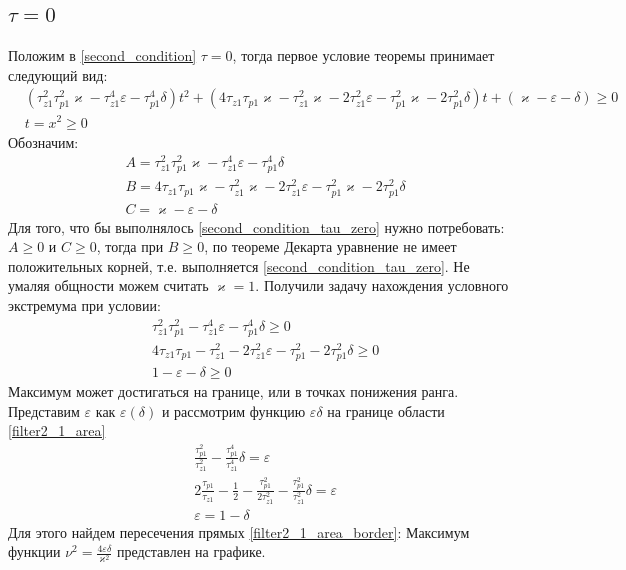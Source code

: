 \documentclass[a4paper,14pt]{extarticle} %
\begin{document}
\subsection{$\tau = 0$}
Положим в \eqref{second_condition} $\tau = 0$, тогда первое условие теоремы принимает следующий вид:
 \begin{equation}\label{second_condition_tau_zero}
 \begin{aligned}
&(\tau_{z1}^2\tau_{p1}^2\varkappa - \tau_{z1}^4\varepsilon - \tau_{p1}^4\delta)t^2 +( 4\tau_{z1}\tau_{p1}\varkappa - \tau_{z1}^2\varkappa - 2\tau_{z1}^2\varepsilon - \tau_{p1}^2\varkappa - 2\tau_{p1}^2\delta)t + (\varkappa-\varepsilon - \delta)  \geq 0\\
&t = x^2 \geq 0
 \end{aligned}
\end{equation}
Обозначим:
 \begin{equation}
 \begin{aligned}
&A = \tau_{z1}^2\tau_{p1}^2\varkappa - \tau_{z1}^4\varepsilon - \tau_{p1}^4\delta\\
&B = 4\tau_{z1}\tau_{p1}\varkappa - \tau_{z1}^2\varkappa - 2\tau_{z1}^2\varepsilon - \tau_{p1}^2\varkappa - 2\tau_{p1}^2\delta\\
&C = \varkappa-\varepsilon - \delta
 \end{aligned}
\end{equation}
Для того, что бы выполнялось \eqref{second_condition_tau_zero} нужно потребовать: $A \geq 0$ и $C \geq 0$, тогда  при $B \geq 0$, по теореме Декарта уравнение не имеет положительных корней, т.е. выполняется \eqref{second_condition_tau_zero}. Не умаляя общности можем считать $\varkappa = 1$. Получили задачу нахождения условного экстремума при условии:
 \begin{equation}\label{filter2_1_area}
 \begin{aligned}
&\tau_{z1}^2\tau_{p1}^2 - \tau_{z1}^4\varepsilon - \tau_{p1}^4\delta \geq 0\\
&4\tau_{z1}\tau_{p1} - \tau_{z1}^2 - 2\tau_{z1}^2\varepsilon - \tau_{p1}^2 - 2\tau_{p1}^2\delta \geq 0\\
&1-\varepsilon - \delta \geq 0
 \end{aligned}
\end{equation}
Максимум может достигаться на границе, или в точках понижения ранга. Представим $\varepsilon$ как $\varepsilon(\delta)$ и рассмотрим функцию $\varepsilon\delta$ на границе области \eqref{filter2_1_area}
 \begin{equation}\label{filter2_1_area_border}
 \begin{aligned}
&\frac{\tau_{p1}^2}{\tau_{z1}^2} - \frac{\tau_{p1}^4}{\tau_{z1}^4}\delta =\varepsilon\\
&2\frac{\tau_{p1}}{\tau_{z1}} - \frac{1}{2} - \frac{\tau_{p1}^2}{2\tau_{z1}^2} - \frac{\tau_{p1}^2}{\tau_{z1}^2}\delta =  \varepsilon\\
&\varepsilon = 1 - \delta
 \end{aligned}
\end{equation}
 Для этого найдем пересечения прямых \eqref{filter2_1_area_border}:
  Максимум функции $\nu^2 = \frac{4\varepsilon\delta}{\varkappa^2}$ представлен на графике.
\end{document}
